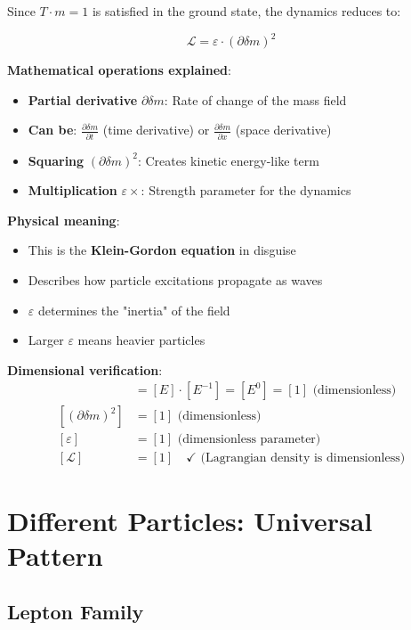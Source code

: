 \documentclass[12pt,a4paper]{article}
\newcommand{\deltam}{\delta m}
\newcommand{\Lag}{\mathcal{L}}
\theoremstyle{definition}
\theoremstyle{remark}
\begin{document}
	Since $T \cdot m = 1$ is satisfied in the ground state, the dynamics reduces to:
	
	\begin{equation}
		\boxed{\Lag = \varepsilon \cdot (\partial \deltam)^2}
		\label{eq:particle_lagrangian}
	\end{equation}
	
	\textbf{Mathematical operations explained}:
	\begin{itemize}
		\item \textbf{Partial derivative} $\partial \deltam$: Rate of change of the mass field
		\item \textbf{Can be}: $\frac{\partial \deltam}{\partial t}$ (time derivative) or $\frac{\partial \deltam}{\partial x}$ (space derivative)
		\item \textbf{Squaring} $(\partial \deltam)^2$: Creates kinetic energy-like term
		\item \textbf{Multiplication} $\varepsilon \times$: Strength parameter for the dynamics
	\end{itemize}
	
	\textbf{Physical meaning}:
	\begin{itemize}
		\item This is the \textbf{Klein-Gordon equation} in disguise
		\item Describes how particle excitations propagate as waves
		\item $\varepsilon$ determines the "inertia" of the field
		\item Larger $\varepsilon$ means heavier particles
	\end{itemize}
	
	\textbf{Dimensional verification}:
	\begin{align}
		[\partial \deltam] &= [E] \cdot [E^{-1}] = [E^0] = [1] \text{ (dimensionless)} \\
		[(\partial \deltam)^2] &= [1] \text{ (dimensionless)} \\
		[\varepsilon] &= [1] \text{ (dimensionless parameter)} \\
		[\Lag] &= [1] \quad \checkmark \text{ (Lagrangian density is dimensionless)}
	\end{align}
	
	\section{Different Particles: Universal Pattern}
	
	\subsection{Lepton Family}
	
\end{document}

